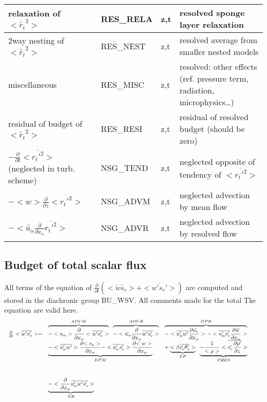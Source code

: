 \begin{longtable}[c]{|p{}|p{}|p{}|p{}|}
{\rm relaxation of }$<\tilde{r_t}^2>$                                  & RES\_RELA  & z,t & resolved sponge layer relaxation \\\hline
{\rm 2way nesting of }$<\tilde{r_t}^2>$                                & RES\_NEST  & z,t & resolved average from smaller nested models \\\hline
{\rm miscellaneous}                                                    & RES\_MISC  & z,t & resolved: other effects (ref. pressure term, radiation, microphysics\ldots) \\\hline
{\rm residual of budget of} $<\tilde{r_t}^2>$                          & RES\_RESI  & z,t & residual of resolved budget (should be zero) \\\hline
$-\frac{\partial }{\partial t}<\overline{r_t'^2}>$ (neglected in turb. scheme) & NSG\_TEND & z,t & neglected opposite of tendency of $<\overline{r_t'^2}>$ \\\hline
$-<w>\frac{\partial}{\partial z}<\overline{r_t'^2}>$                   & NSG\_ADVM  & z,t & neglected advection by mean flow\\\hline
$-<\tilde{u_\alpha}\frac{\partial}{\partial x_\alpha}\overline{r_t'^2}>$  & NSG\_ADVR & z,t & neglected advection by resolved flow\\\hline
\end{longtable}
\endgroup


\subsection{Budget of total scalar flux}


All terms of the equation of $\frac{\partial}{\partial t} (<\tilde{w}\tilde{s_v}> + <\overline{w's_v'}>)$ are
computed and stored in the diachronic group BU\_WSV. 
All comments made for the total Tke equation are valid here.\\

\begin{displaymath}
\left.
\begin{array}{rllll}
\frac{\partial }{\partial t} <\overline{w's_v'}> = & 
\overbrace{- <u_\alpha>\frac{\partial}{\partial x_\alpha} <\overline{w's_v'}> }^{ADVM} \;\;
\overbrace{- <\tilde{u_\alpha}\frac{\partial}{\partial x_\alpha} \overline{w's_v'} > }^{ADVR} &
\overbrace{- <\overline{u'_\alpha w'} \frac{\partial {\tilde{s_v}}}{\partial x_\alpha}>
- <\overline{u'_\alpha s_v'} \frac{\partial {\tilde{w}}}{\partial x_\alpha}>}^{DPR}&\\
\vspace*{1.0cm}
& \underbrace{- <\overline{u_\alpha'w'}> \frac{\partial {<s_v>}}{\partial x_\alpha}
- <\overline{u'_\alpha s_v'}> \frac{\partial {<w>}}{\partial x_\alpha}}_{DPM}&
+ \underbrace{<\beta  \overline{s_v'\theta'_v}>}_{TP} \;\; \underbrace{- \frac{1}{<\rho>}<\overline{s_v' \frac{\partial p'}{\partial z}}>}_{PRES}&\\
&\underbrace{- <\frac{\partial}{\partial x_\alpha} \overline{u'_\alpha w's_v'}>}_{TR}&&& \\
\end{array}
\right.
\end{displaymath}

